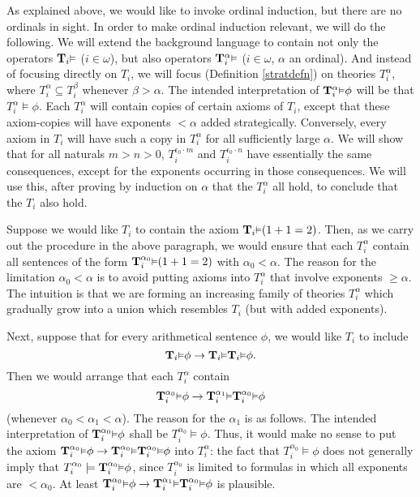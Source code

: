 \documentclass[reqno]{article}
\theoremstyle{definition}
\def\T{\mathbf{T}}
\renewcommand{\Pr}[1]{\T_{#1}\mbox{\small${\vDash}$}}
\newcommand{\Prr}[2]{\T^{#1}_{#2}\mbox{\small${\vDash}$}}
\begin{document}
As explained above, we would like to invoke ordinal induction, but there
are no ordinals in sight.
In order to make ordinal
induction relevant, we will do the following.
We will extend the background language to contain not only
the operators $\Pr i$ ($i\in\omega$), but also operators $\Prr \alpha i$
($i\in\omega$, $\alpha$ an ordinal). And instead of focusing directly on $T_i$,
we will focus (Definition \ref{stratdefn})
on theories $T^\alpha_i$, where $T^\alpha_i\subseteq T^\beta_i$ whenever $\beta>\alpha$.
The intended interpretation
of $\Prr \alpha i \phi$ will be that
$T^\alpha_i\models\phi$.
Each $T^\alpha_i$ will contain copies of certain axioms of $T_i$, except that these
axiom-copies will have exponents $<\alpha$ added strategically.
Conversely, every axiom in $T_i$ will have such a copy in $T^\alpha_i$ for
all sufficiently large $\alpha$.
We will show that for all naturals $m>n>0$,
$T^{\epsilon_0\cdot m}_i$ and $T^{\epsilon_0\cdot n}_i$
have essentially the same consequences, except for the exponents
occurring in those consequences.
We will use this, after proving by induction on $\alpha$ that
the $T^\alpha_i$ all hold,
to conclude that the $T_i$ also hold.

Suppose we would like $T_i$ to contain the axiom $\Pr i(1+1=2)$.
Then, as we carry out the procedure in the above paragraph, we would ensure that
each $T^\alpha_i$ contain all sentences of the form
$\Prr {\alpha_0} i (1+1=2)$ with $\alpha_0<\alpha$.
The reason for the limitation $\alpha_0<\alpha$ is to avoid putting axioms
into $T^\alpha_i$ that involve exponents $\geq \alpha$.
The intuition is that we are forming an increasing family of theories $T^\alpha_i$ which
gradually grow into a union which resembles $T_i$ (but with added exponents).

Next, suppose that for every arithmetical sentence $\phi$,
we would like $T_i$ to include
\[\Pr i\phi\rightarrow \Pr i\Pr i\phi.\]
Then we would arrange that
each $T^\alpha_i$ contain
\[\Prr {\alpha_0} i\phi \rightarrow \Prr {\alpha_1} i \Prr {\alpha_0} i \phi\]
(whenever $\alpha_0<\alpha_1<\alpha$).
The reason for the $\alpha_1$ is as follows.
The intended interpretation of $\Prr {\alpha_0} i \phi$ shall be
$T^{\alpha_0}_i\models \phi$. Thus, it would make no sense to put
the axiom
$\Prr {\alpha_0} i\phi \rightarrow \Prr {\alpha_0} i \Prr {\alpha_0} i \phi$
into $T^\alpha_i$: the fact that $T^{\alpha_0}_i\models \phi$
does not generally imply that
$T^{\alpha_0}_i\models \Prr {\alpha_0} i \phi$,
since $T^{\alpha_0}_i$ is limited to formulas in which all exponents
are $<\alpha_0$. At least
$\Prr {\alpha_0} i\phi \rightarrow \Prr {\alpha_1} i \Prr {\alpha_0} i \phi$
is plausible.
\end{document}
